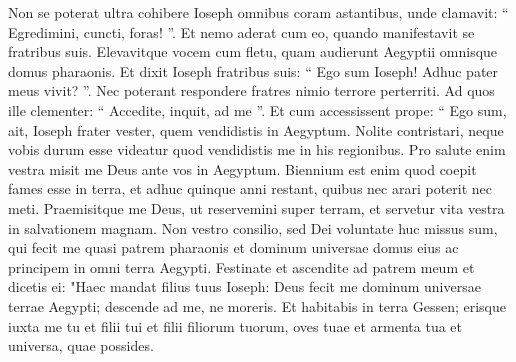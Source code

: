 \begin{biblechapter}
\begin{biblechapter}
\begin{biblechapter}
\begin{biblechapter}
\begin{biblechapter}
\begin{biblechapter}
\begin{biblechapter}
\begin{biblechapter}
\begin{biblechapter}
\begin{biblechapter}
\begin{biblechapter}
\begin{biblechapter}
\begin{biblechapter}
\begin{biblechapter}
\begin{biblechapter}
\begin{biblechapter}
\begin{biblechapter}
\begin{biblechapter}
\begin{biblechapter}
\begin{biblechapter}
\begin{biblechapter}
\begin{biblechapter}
\begin{biblechapter}
\begin{biblechapter}
\begin{biblechapter}
\begin{biblechapter}
\begin{biblechapter}
\begin{biblechapter}
\begin{biblechapter}
\begin{biblechapter}
\begin{biblechapter}
\begin{biblechapter}
\begin{biblechapter}
\begin{biblechapter}
\begin{biblechapter}
\begin{biblechapter}
\begin{biblechapter}
\begin{biblechapter}
\begin{biblechapter}
\begin{biblechapter}
\begin{biblechapter}
\begin{biblechapter}
\begin{biblechapter}
\begin{biblechapter}
\begin{biblechapter}
\verse Non se poterat ultra cohibere Ioseph omnibus coram astantibus, unde clamavit: “ Egredimini, cuncti, foras! ”. Et nemo aderat cum eo, quando manifestavit se fratribus suis. 
\verse Elevavitque vocem cum fletu, quam audierunt Aegyptii omnisque domus pharaonis. 
\verse Et dixit Ioseph fratribus suis: “ Ego sum Ioseph! Adhuc pater meus vivit? ”. Nec poterant respondere fratres nimio terrore perterriti. 
\verse Ad quos ille clementer: “ Accedite, inquit, ad me ”. Et cum accessissent prope: “ Ego sum, ait, Ioseph frater vester, quem vendidistis in Aegyptum. 
\verse Nolite contristari, neque vobis durum esse videatur quod vendidistis me in his regionibus. Pro salute enim vestra misit me Deus ante vos in Aegyptum. 
\verse Biennium est enim quod coepit fames esse in terra, et adhuc quinque anni restant, quibus nec arari poterit nec meti. 
\verse Praemisitque me Deus, ut reservemini super terram, et servetur vita vestra in salvationem magnam. 
\verse Non vestro consilio, sed Dei voluntate huc missus sum, qui fecit me quasi patrem pharaonis et dominum universae domus eius ac principem in omni terra Aegypti.
 \verse Festinate et ascendite ad patrem meum et dicetis ei: "Haec mandat filius tuus Ioseph: Deus fecit me dominum universae terrae Aegypti; descende ad me, ne moreris. 
\verse Et habitabis in terra Gessen; erisque iuxta me tu et filii tui et filii filiorum tuorum, oves tuae et armenta tua et universa, quae possides. 

\end{biblechapter}
\end{biblechapter}
\end{biblechapter}
\end{biblechapter}
\end{biblechapter}
\end{biblechapter}
\end{biblechapter}
\end{biblechapter}
\end{biblechapter}
\end{biblechapter}
\end{biblechapter}
\end{biblechapter}
\end{biblechapter}
\end{biblechapter}
\end{biblechapter}
\end{biblechapter}
\end{biblechapter}
\end{biblechapter}
\end{biblechapter}
\end{biblechapter}
\end{biblechapter}
\end{biblechapter}
\end{biblechapter}
\end{biblechapter}
\end{biblechapter}
\end{biblechapter}
\end{biblechapter}
\end{biblechapter}
\end{biblechapter}
\end{biblechapter}
\end{biblechapter}
\end{biblechapter}
\end{biblechapter}
\end{biblechapter}
\end{biblechapter}
\end{biblechapter}
\end{biblechapter}
\end{biblechapter}
\end{biblechapter}
\end{biblechapter}
\end{biblechapter}
\end{biblechapter}
\end{biblechapter}
\end{biblechapter}
\end{biblechapter}
